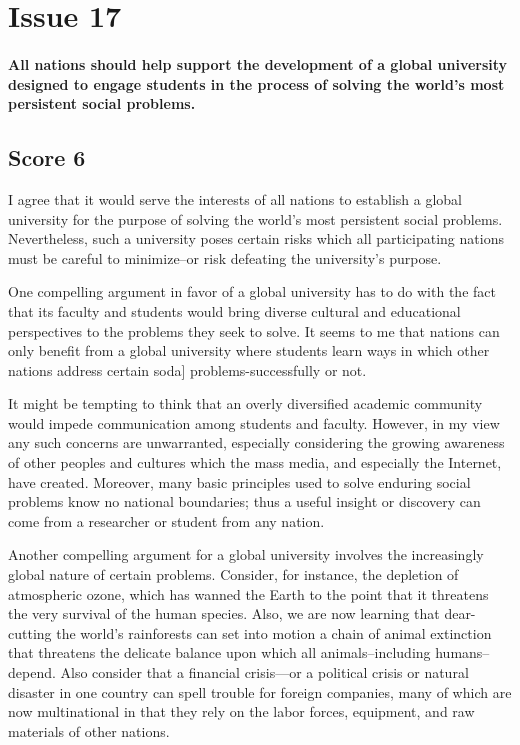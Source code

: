\section{Issue 17}
\paragraph{
All nations should help support the development of a global university designed to engage students in the process of solving the world's most persistent social problems.
}
\subsection{Score 6}


I agree that it would serve the interests of all nations to establish a global university for the purpose of solving the world's most persistent social problems.
Nevertheless, such a university poses certain risks which all participating nations must be careful to minimize--or risk defeating the university's purpose.


One compelling argument in favor of a global university has to do with the fact that its faculty and students would bring diverse cultural and educational perspectives to the problems they seek to solve.
It seems to me that nations can only benefit from a global university where students learn ways in which other nations address certain soda] problems-successfully or not.


It might be tempting to think that an overly diversified academic community would impede communication among students and faculty.
However, in my view any such concerns are unwarranted, especially considering the growing awareness of other peoples and cultures which the mass media, and especially the Internet, have created.
Moreover, many basic principles used to solve enduring social problems know no national boundaries; thus a useful insight or discovery can come from a researcher or student from any nation.


Another compelling argument for a global university involves the increasingly global nature of certain problems.
Consider, for instance, the depletion of atmospheric ozone, which has wanned the Earth to the point that it threatens the very survival of the human species.
Also, we are now learning that dear-cutting the world's rainforests can set into motion a chain of animal extinction that threatens the delicate balance upon which all animals--including humans--depend.
Also consider that a financial crisis---or a political crisis or natural disaster in one country can spell trouble for foreign companies, many of which are now multinational in that they rely on the labor forces, equipment, and raw materials of other nations.


